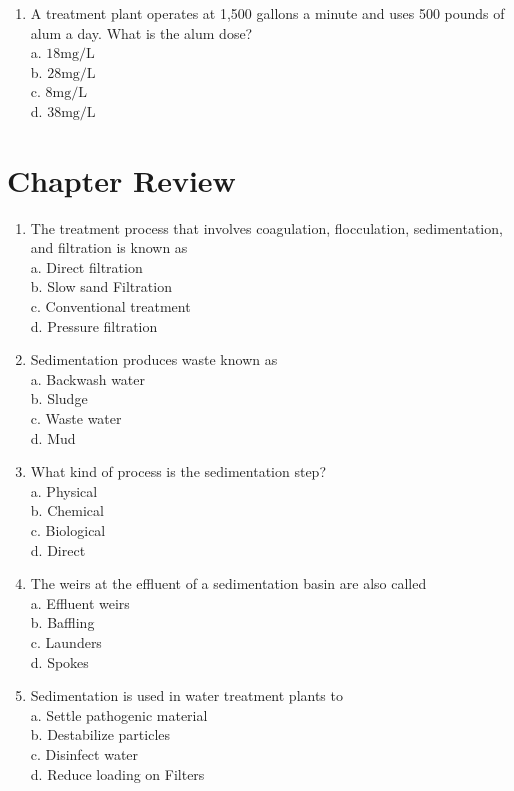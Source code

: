 \documentclass[10pt]{article}
\begin{document}
\begin{enumerate}
  \item A treatment plant operates at 1,500 gallons a minute and uses 500 pounds of alum a day. What is the alum dose?\\
a. $18 \mathrm{mg} / \mathrm{L}$\\
b. $28 \mathrm{mg} / \mathrm{L}$\\
c. $8 \mathrm{mg} / \mathrm{L}$\\
d. $38 \mathrm{mg} / \mathrm{L}$

\end{enumerate}
\section{Chapter Review}
\begin{enumerate}
  \item The treatment process that involves coagulation, flocculation, sedimentation, and filtration is known as\\
a. Direct filtration\\
b. Slow sand Filtration\\
c. Conventional treatment\\
d. Pressure filtration

  \item Sedimentation produces waste known as\\
a. Backwash water\\
b. Sludge\\
c. Waste water\\
d. Mud

  \item What kind of process is the sedimentation step?\\
a. Physical\\
b. Chemical\\
c. Biological\\
d. Direct

  \item The weirs at the effluent of a sedimentation basin are also called\\
a. Effluent weirs\\
b. Baffling\\
c. Launders\\
d. Spokes

  \item Sedimentation is used in water treatment plants to\\
a. Settle pathogenic material\\
b. Destabilize particles\\
c. Disinfect water\\
d. Reduce loading on Filters


\end{enumerate}
\end{document}
